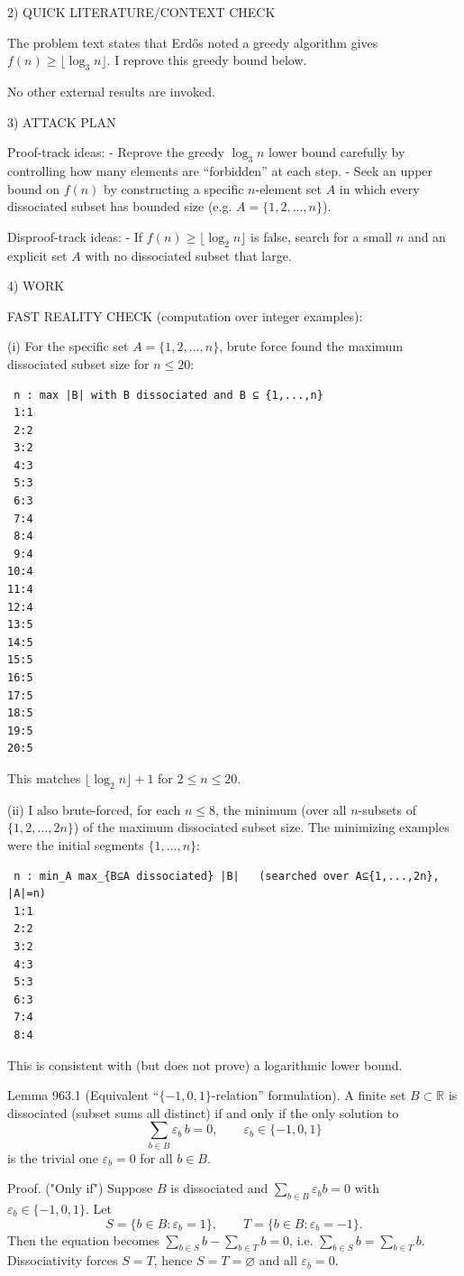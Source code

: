 2) QUICK LITERATURE/CONTEXT CHECK

The problem text states that Erd\H{o}s noted a greedy algorithm gives $f(n)\ge \lfloor \log_3 n\rfloor$. I reprove this greedy bound below.

No other external results are invoked.

3) ATTACK PLAN

Proof-track ideas:
- Reprove the greedy $\log_3 n$ lower bound carefully by controlling how many elements are “forbidden” at each step.
- Seek an upper bound on $f(n)$ by constructing a specific $n$-element set $A$ in which every dissociated subset has bounded size (e.g. $A=\{1,2,\dots,n\}$).

Disproof-track ideas:
- If $f(n)\ge \lfloor\log_2 n\rfloor$ is false, search for a small $n$ and an explicit set $A$ with no dissociated subset that large.

4) WORK

FAST REALITY CHECK (computation over integer examples):

(i) For the specific set $A=\{1,2,\dots,n\}$, brute force found the maximum dissociated subset size for $n\le 20$:
\begin{verbatim}
 n : max |B| with B dissociated and B ⊆ {1,...,n}
 1:1
 2:2
 3:2
 4:3
 5:3
 6:3
 7:4
 8:4
 9:4
10:4
11:4
12:4
13:5
14:5
15:5
16:5
17:5
18:5
19:5
20:5
\end{verbatim}
This matches $\lfloor \log_2 n\rfloor+1$ for $2\le n\le 20$.

(ii) I also brute-forced, for each $n\le 8$, the minimum (over all $n$-subsets of $\{1,2,\dots,2n\}$) of the maximum dissociated subset size. The minimizing examples were the initial segments $\{1,\dots,n\}$:
\begin{verbatim}
 n : min_A max_{B⊆A dissociated} |B|   (searched over A⊆{1,...,2n}, |A|=n)
 1:1
 2:2
 3:2
 4:3
 5:3
 6:3
 7:4
 8:4
\end{verbatim}
This is consistent with (but does not prove) a logarithmic lower bound.

Lemma 963.1 (Equivalent “$\{-1,0,1\}$-relation” formulation).
A finite set $B\subset\mathbb R$ is dissociated (subset sums all distinct) if and only if the only solution to
\[
\sum_{b\in B} \varepsilon_b\, b = 0,\qquad \varepsilon_b\in\{-1,0,1\}
\]
is the trivial one $\varepsilon_b=0$ for all $b\in B$.

Proof.
("Only if") Suppose $B$ is dissociated and $\sum_{b\in B}\varepsilon_b b=0$ with $\varepsilon_b\in\{-1,0,1\}$. Let
\[
S=\{b\in B:\varepsilon_b=1\},\qquad T=\{b\in B:\varepsilon_b=-1\}.
\]
Then the equation becomes $\sum_{b\in S} b - \sum_{b\in T} b=0$, i.e. $\sum_{b\in S} b = \sum_{b\in T} b$. Dissociativity forces $S=T$, hence $S=T=\varnothing$ and all $\varepsilon_b=0$.

